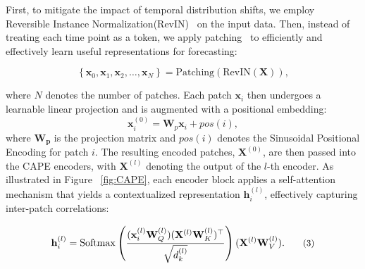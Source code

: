 First, to mitigate the impact of temporal distribution shifts, we employ Reversible Instance Normalization(RevIN)~\cite{kim2021reversible} on the input data. Then, instead of treating each time point as a token, we apply patching~\cite{nie2022time} to efficiently and effectively learn useful representations for forecasting:


\[
\left\{ \mathbf{x}_0, \mathbf{x}_1, \mathbf{x}_2, \ldots, \mathbf{x}_N \right\} = \text{Patching}(\text{RevIN}(\mathbf{X})), \tag{1}
\]

where $N$ denotes the number of patches. Each patch \( \mathbf{x}_i \) then undergoes a learnable linear projection and is augmented with a positional embedding:
\[
\mathbf{x}_i^{(0)} = \mathbf{W}_{p} \mathbf{x}_i + pos(i), \tag{2}
\]
where $\mathbf{W_{p}}$ is the projection matrix and \( pos(i) \) denotes the Sinusoidal Positional Encoding for patch \( i \). 
The resulting encoded patches, \(\mathbf{X}^{(0)}\), are then passed into the CAPE encoders, with \(\mathbf{X}^{(l)}\) denoting the output of the \(l\)-th encoder. As illustrated in Figure ~\ref{fig:CAPE}, each encoder block applies a self-attention mechanism that yields a contextualized representation \(\mathbf{h}_i^{(l)}\), effectively capturing inter-patch correlations:


\[
\small
\mathbf{h}_i^{(l)} = \operatorname{Softmax}\left( \frac{(\mathbf{x}_i^{(l)} \mathbf{W}_Q^{(l)}) (\mathbf{X}^{(l)} \mathbf{W}_K^{(l)})^\top}{\sqrt{d_k^{(l)}}} \right) (\mathbf{X}^{(l)} \mathbf{W}_V^{(l)}). \tag{3} 
\]




